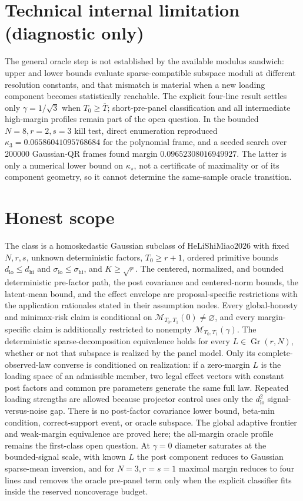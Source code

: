 \documentclass{article}
\begin{document}
\section*{Technical internal limitation (diagnostic only)}

The general oracle step is not established by the available modulus sandwich: upper and lower bounds evaluate sparse-compatible subspace moduli at different resolution constants, and that mismatch is material when a new loading component becomes statistically reachable. The explicit four-line result settles only \(\gamma=1/\sqrt3\) when \(T_0\ge\overline T\); short-pre-panel classification and all intermediate high-margin profiles remain part of the open question. In the bounded \(N=8,r=2,s=3\) kill test, direct enumeration reproduced \(\kappa_3=0.06586041095768684\) for the polynomial frame, and a seeded search over 200000 Gaussian-QR frames found margin \(0.09652308016949927\). The latter is only a numerical lower bound on \(\kappa_\star\), not a certificate of maximality or of its component geometry, so it cannot determine the same-sample oracle transition.

\section{Honest scope}

The class is a homoskedastic Gaussian subclass of HeLiShiMiao2026 with fixed \(N,r,s\), unknown deterministic factors, \(T_0\ge r+1\), ordered primitive bounds \(d_{\mathrm{lo}}\le d_{\mathrm{hi}}\) and \(\sigma_{\mathrm{lo}}\le\sigma_{\mathrm{hi}}\), and \(K\ge\sqrt r\). The centered, normalized, and bounded deterministic pre-factor path, the post covariance and centered-norm bounds, the latent-mean bound, and the effect envelope are proposal-specific restrictions with the application rationales stated in their assumption nodes. Every global-honesty and minimax-risk claim is conditional on \(\mathcal M_{T_0,T_1}(0)\ne\varnothing\), and every margin-specific claim is additionally restricted to nonempty \(\mathcal M_{T_0,T_1}(\gamma)\). The deterministic sparse-decomposition equivalence holds for every \(L\in\operatorname{Gr}(r,N)\), whether or not that subspace is realized by the panel model. Only its complete-observed-law converse is conditioned on realization: if a zero-margin \(L\) is the loading space of an admissible member, two legal effect vectors with constant post factors and common pre parameters generate the same full law. Repeated loading strengths are allowed because projector control uses only the \(d_{\mathrm{lo}}^2\) signal-versus-noise gap. There is no post-factor covariance lower bound, beta-min condition, correct-support event, or oracle subspace. The global adaptive frontier and weak-margin equivalence are proved here; the all-margin oracle profile remains the first-class open question. At \(\gamma=0\) diameter saturates at the bounded-signal scale, with known \(L\) the post component reduces to Gaussian sparse-mean inversion, and for \(N=3,r=s=1\) maximal margin reduces to four lines and removes the oracle pre-panel term only when the explicit classifier fits inside the reserved noncoverage budget.
\end{document}
